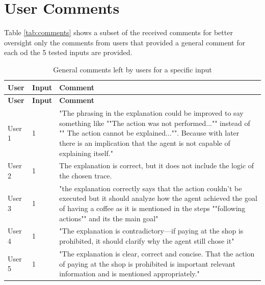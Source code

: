 \documentclass[sigconf,nonacm]{acmart}
\begin{document}
\section{User Comments} \label{app:comments}
Table \ref{tab:comments} shows a subset of the received comments for better oversight only the comments from users that provided a general comment for each od the 5 tested inputs are provided.



\onecolumn
\renewcommand{\arraystretch}{1.2}

\begin{longtable}{l|l|p{15cm}} %
    \caption{General comments left by users for a specific input} \\
    \hline
    \textbf{User} & \textbf{Input} & \textbf{Comment} \\
    \hline
    \endfirsthead

    \hline
    \textbf{User} & \textbf{Input} & \textbf{Comment} \\
    \hline
    \endhead

    \hline
    \endfoot

    \hline
    \endlastfoot

    User 1 & 1 & "The phrasing in the explanation could be improved to say something like ""The action was not performed..."" instead of "" The action cannot be explained..."". Because with later there is an implication that the agent is not capable of explaining itself."  \\

        User 2 & 1 & The explanation is correct, but it does not include the logic of the chosen trace.\\

        User 3 & 1 & "the explanation correctly says that the action couldn't be executed but it should analyze how the agent achieved the goal of having a coffee as it is mentioned in the steps ""following actions"" and its the main goal"\\
        User 4 & 1 & "The explanation is contradictory—if paying at the shop is prohibited, it should clarify why the agent still chose it" \\
        User 5 & 1 & "The explanation is clear, correct and concise. That the action of paying at the shop is prohibited is important
relevant information and is mentioned appropriately." \\

        \midrule


\end{longtable}
\end{document}
